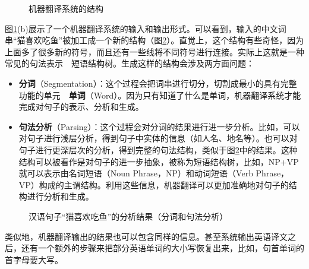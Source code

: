 \begin{figure}[htp]
    \centering
 	\subfigure[机器翻译系统被看作一个黑盒] {  }
 	\subfigure[机器翻译系统 = 前/后处理 + 核心引擎] {}
	\caption{机器翻译系统的结构}
    \label{fig:3.1-1}
\end{figure}

\parinterval 图\ref{fig:3.1-1}(b)展示了一个机器翻译系统的输入和输出形式。可以看到，输入的中文词串“猫喜欢吃鱼”被加工成一个新的结构（图\ref{fig:3.1-2}）。直觉上，这个结构有些奇怪，因为上面多了很多新的符号，而且还有一些线将不同符号进行连接。实际上这就是一种常见的句法表示\ \dash \ 短语结构树。生成这样的结构会涉及两方面问题：

\begin{itemize}
\vspace{0.5em}
\item {\small\sffamily\bfseries{分词}}（Segmentation）：这个过程会把词串进行切分，切割成最小的具有完整功能的单元\ \dash\ {\small\sffamily\bfseries{单词}}（Word）。因为只有知道了什么是单词，机器翻译系统才能完成对句子的表示、分析和生成。
\vspace{0.5em}
\item {\small\sffamily\bfseries{句法分析}}（Parsing）：这个过程会对分词的结果进行进一步分析。比如，可以对句子进行浅层分析，得到句子中实体的信息（如人名、地名等）。也可以对句子进行更深层次的分析，得到完整的句法结构，类似于图\ref{fig:3.1-2}中的结果。这种结构可以被看作是对句子的进一步抽象，被称为短语结构树，比如，NP+VP就可以表示由名词短语（Noun Phrase，NP）和动词短语（Verb Phrase，VP）构成的主谓结构。利用这些信息，机器翻译可以更加准确地对句子的结构进行分析和生成。
\vspace{0.5em}
\end{itemize}

\begin{figure}[htp]
\centering

\caption{汉语句子“猫喜欢吃鱼”的分析结果（分词和句法分析）}
\label{fig:3.1-2}
\end{figure}

\parinterval 类似地，机器翻译输出的结果也可以包含同样的信息。甚至系统输出英语译文之后，还有一个额外的步骤来把部分英语单词的大小写恢复出来，比如，句首单词的首字母要大写。

